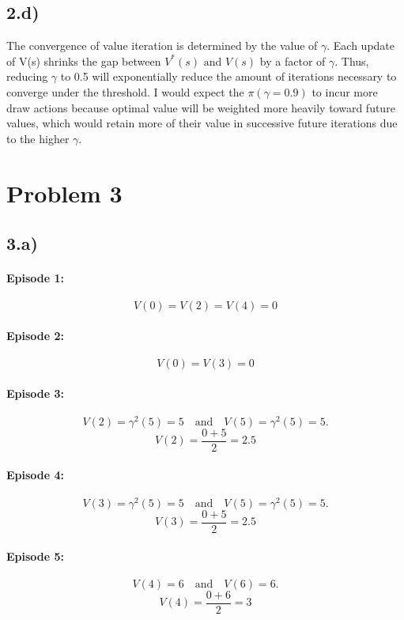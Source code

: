 \documentclass[11pt]{article}
\begin{document}
\subsection*{2.d)}
The convergence of value iteration is determined by the value of $\gamma$. Each update of V(s) shrinks the gap between $V^*(s) \text{ and } V(s)$ by
a factor of $\gamma$. Thus, reducing $\gamma$ to 0.5 will exponentially reduce the amount of iterations necessary to converge under the threshold.
I would expect the $\pi(\gamma = 0.9)$ to incur more draw actions because optimal value will be weighted more heavily toward future values, which
would retain more of their value in successive future iterations due to the higher $\gamma$.

\newpage
\section*{Problem 3}
\subsection*{3.a)}
\paragraph{Episode 1:}
\[
V(0) = V(2) = V(4) = 0
\]

\paragraph{Episode 2:}
\[
V(0) = V(3) = 0
\]

\paragraph{Episode 3:}
\[
V(2) = \gamma^2(5) = 5
\quad\text{and}\quad
V(5) = \gamma^2(5) = 5.
\]
\[
V(2) = \frac{0 + 5}{2} = 2.5
\]

\paragraph{Episode 4:}
\[
V(3) = \gamma^2(5) = 5
\quad\text{and}\quad
V(5) = \gamma^2(5) = 5.
\]
\[
V(3) = \frac{0 + 5}{2} = 2.5
\]

\paragraph{Episode 5:}
\[
V(4) = 6
\quad\text{and}\quad
V(6) = 6.
\]
\[
V(4) = \frac{0 + 6}{2} = 3
\]
\end{document}
